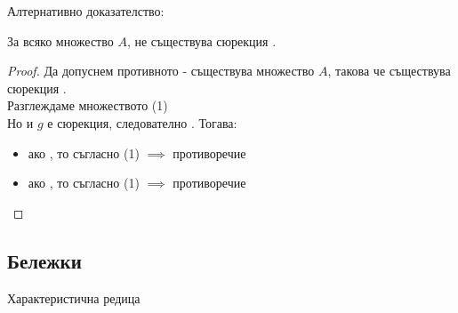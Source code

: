 Алтернативно доказателство:
\begin{theorem}
    За всяко множество \(A\), не съществува сюрекция .
\end{theorem}
\begin{proof}
    Да допуснем противното - съществува множество \(A\), такова че съществува сюрекция . \\
    Разглеждаме множеството  (1) \\
    Но  и \(g\) е сюрекция, следователно .
    Тогава:
    \begin{itemize}
        \item ако , то  съгласно (1) \(\implies\) противоречие
        \item ако , то  съгласно (1) \(\implies\) противоречие
    \end{itemize}
\end{proof}

\subsection*{Бележки}
\begin{definition}
\end{definition}

\begin{definition}
    Характеристична редица
\end{definition}